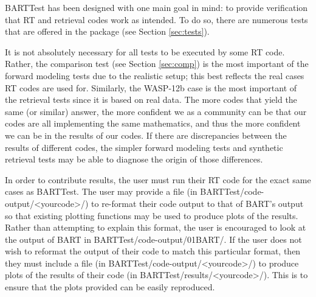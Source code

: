 \documentclass[letterpaper, 12pt]{article}
\begin{document}
BARTTest has been designed with one main goal in mind: to provide verification 
that RT and retrieval codes work as intended. To do so, there are numerous 
tests that are offered in the package (see Section \ref{sec:tests}).

It is not absolutely necessary for all tests to be executed by some RT code. 
Rather, the comparison test (see Section \ref{sec:comp}) is the most important 
of the forward modeling tests due to the realistic setup; this best reflects 
the real cases RT codes are used for. Similarly, the WASP-12b case is the most 
important of the retrieval tests since it is based on real data. The more 
codes that yield the same (or similar) answer, the more confident we as a 
community can be that our codes are all implementing the same mathematics, 
and thus the more confident we can be in the results of our codes. If there 
are discrepancies between the results of different codes, the simpler forward 
modeling tests and synthetic retrieval tests may be able to diagnose the origin 
of those differences.

In order to contribute results, the user must run their RT code for the exact 
same cases as BARTTest. The user may provide a file 
(in BARTTest/code-output/{\textless}yourcode{\textgreater}/) to re-format 
their code output to that of BART's output so that existing plotting functions 
may be used to produce plots of the results. Rather than attempting 
to explain this format, the user is encouraged to look at the output of BART 
in BARTTest/code-output/01BART/. If the user does not wish to reformat the 
output of their code to match this particular format, then they must include a 
file (in BARTTest/code-output/{\textless}yourcode{\textgreater}/) to produce 
plots of the results of their code 
(in BARTTest/results/{\textless}yourcode{\textgreater}/). 
This is to ensure that the plots provided can be easily reproduced.
\end{document}
